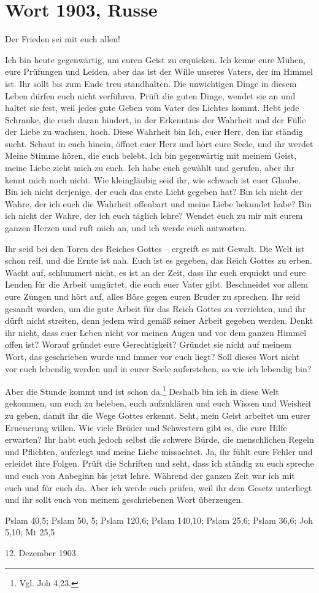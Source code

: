\chapter{Wort 1903, Russe}

Der Frieden sei mit euch allen!

Ich bin heute gegenwärtig, um euren Geist zu erquicken. Ich kenne eure Mühen, eure Prüfungen und Leiden, aber das ist der Wille unseres Vaters, der im Himmel ist. Ihr sollt bis zum Ende treu standhalten. Die unwichtigen Dinge in diesem Leben dürfen euch nicht verführen. Prüft die guten Dinge, wendet sie an und haltet sie fest, weil jedes gute Geben vom Vater des Lichtes kommt. Hebt jede Schranke, die euch daran hindert, in der Erkenntnis der Wahrheit und der Fülle der Liebe zu wachsen, hoch. Diese Wahrheit bin Ich, euer Herr, den ihr ständig sucht. Schaut in euch hinein, öffnet euer Herz und hört eure Seele, und ihr werdet Meine Stimme hören, die euch belebt. Ich bin gegenwärtig mit meinem Geist, meine Liebe zieht mich zu euch. Ich habe euch gewählt und gerufen, aber ihr kennt mich noch nicht. Wie kleingläubig seid ihr, wie schwach ist euer Glaube. Bin ich nicht derjenige, der euch das erste Licht gegeben hat? Bin ich nicht der Wahre, der ich euch die Wahrheit offenbart und meine Liebe bekundet habe? Bin ich nicht der Wahre, der ich euch täglich lehre? Wendet euch zu mir mit eurem ganzen Herzen und ruft mich an, und ich werde euch antworten. 

Ihr seid bei den Toren des Reiches Gottes -- ergreift es mit Gewalt. Die Welt ist schon reif, und die Ernte ist nah. Euch ist es gegeben, das Reich Gottes zu erben. Wacht auf, schlummert nicht, es ist an der Zeit, dass ihr euch erquickt und eure Lenden für die Arbeit umgürtet, die euch euer Vater gibt. Beschneidet vor allem eure Zungen und hört auf, alles Böse gegen euren Bruder zu sprechen. Ihr seid gesandt worden, um die gute Arbeit für das Reich Gottes zu verrichten, und ihr dürft nicht streiten, denn jedem wird gemäß seiner Arbeit gegeben werden. Denkt ihr nicht, dass euer Leben nicht vor meinen Augen und vor dem ganzen Himmel offen ist? Worauf gründet eure Gerechtigkeit? Gründet sie nicht auf meinem Wort, das geschrieben wurde und immer vor euch liegt? Soll dieses Wort nicht vor euch lebendig werden und in eurer Seele auferstehen, so wie ich lebendig bin?

Aber die Stunde kommt und ist schon da.\footnote{Vgl. Joh 4,23.} Deshalb bin ich in diese Welt gekommen, um euch zu beleben, euch aufzuklären und euch Wissen und Weisheit zu geben, damit ihr die Wege Gottes erkennt. Seht, mein Geist arbeitet um eurer Erneuerung willen. Wie viele Brüder und Schwestern gibt es, die eure Hilfe erwarten? Ihr habt euch jedoch selbst die schwere Bürde, die menschlichen Regeln und Pflichten, auferlegt und meine Liebe missachtet. Ja, ihr fühlt eure Fehler und erleidet ihre Folgen. Prüft die Schriften und seht, dass ich ständig zu euch spreche und euch von Anbeginn bis jetzt lehre. Während der ganzen Zeit war ich mit euch und für euch da. Aber ich werde euch prüfen, weil ihr dem Gesetz unterliegt und ihr sollt euch von meinem geschriebenen Wort überzeugen. 

Pslam 40,5; Pslam 50, 5; Pslam 120,6; Pslam 140,10; Pslam 25,6; Pslam 36,6; Joh 5,10; Mt 25,5

12. Dezember 1903